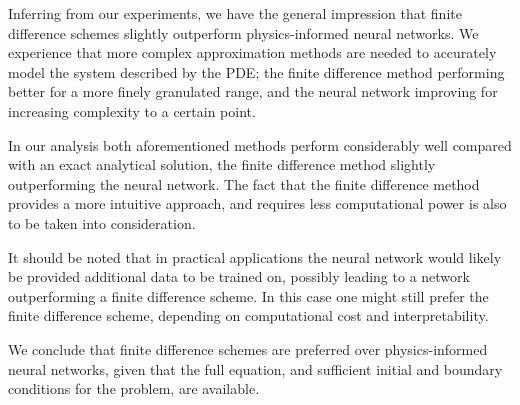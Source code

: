 Inferring from our experiments, we have the general impression that finite difference schemes slightly outperform physics-informed neural networks. 
We experience that more complex approximation methods are needed to accurately model the system described by the PDE; the finite difference method performing better for a more finely granulated range, and the neural network improving for increasing complexity to a certain point. 

In our analysis both aforementioned methods perform considerably well compared with an exact analytical solution, the finite difference method slightly outperforming the neural network. 
The fact that the finite difference method provides a more intuitive approach, and requires less computational power is also to be taken into consideration.

It should be noted that in practical applications the neural network would likely be provided additional data to be trained on, possibly leading to a network outperforming a finite difference scheme. In this case one might still prefer the finite difference scheme, depending on computational cost and interpretability. 


We conclude that finite difference schemes are preferred over physics-informed neural networks, given that the full equation, and sufficient initial and boundary conditions for the problem, are available. 